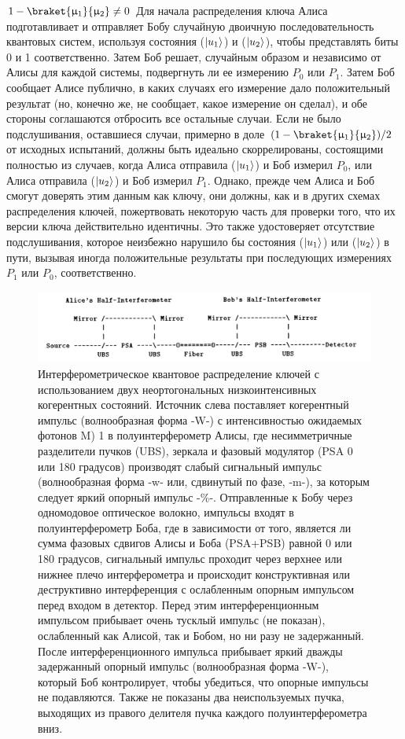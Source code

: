 $1 -\braket{\mu_1}{\mu_2}\neq 0$
Для начала распределения ключа Алиса подготавливает и отправляет Бобу случайную двоичную последовательность квантовых систем, используя состояния ($\lvert u_1\rangle$) и ($\lvert u_2\rangle$), чтобы представлять биты 0 и 1 соответственно. Затем Боб решает, случайным образом и независимо от Алисы для каждой системы, подвергнуть ли ее измерению $P_0$ или $P_1$. Затем Боб сообщает Алисе публично, в каких случаях его измерение дало положительный результат (но, конечно же, не сообщает, какое измерение он сделал), и обе стороны соглашаются отбросить все остальные случаи. Если не было подслушивания, оставшиеся случаи, примерно в доле $(1 -\braket{\mu_1}{\mu_2})/2$ от исходных испытаний, должны быть идеально скоррелированы, состоящими полностью из случаев, когда Алиса отправила ($\lvert u_1\rangle$) и Боб измерил $P_0$, или Алиса отправила ($\lvert u_2\rangle$) и Боб измерил $P_1$. Однако, прежде чем Алиса и Боб смогут доверять этим данным как ключу, они должны, как и в других схемах распределения ключей, пожертвовать некоторую часть для проверки того, что их версии ключа действительно идентичны. Это также удостоверяет отсутствие подслушивания, которое неизбежно нарушило бы состояния ($\lvert u_1\rangle$) или ($\lvert u_2\rangle$) в пути, вызывая иногда положительные результаты при последующих измерениях $P_1$ или $P_0$, соответственно.
\begin{figure}
    \centering
    \includegraphics[width=\linewidth]{images/B92 scheme from article.png}
    \caption{Интерферометрическое квантовое распределение ключей с использованием двух неортогональных низкоинтенсивных когерентных состояний. Источник слева поставляет когерентный импульс (волнообразная форма -W-) с интенсивностью ожидаемых фотонов M) 1 в полуинтерферометр Алисы, где несимметричные разделители пучков (UBS), зеркала и фазовый модулятор (PSA 0 или 180 градусов) производят слабый сигнальный импульс (волнообразная форма -w- или, сдвинутый по фазе, -m-), за которым следует яркий опорный импульс -\%-. Отправленные к Бобу через одномодовое оптическое волокно, импульсы входят в полуинтерферометр Боба, где в зависимости от того, является ли сумма фазовых сдвигов Алисы и Боба (PSA+PSB) равной 0 или 180 градусов, сигнальный импульс проходит через верхнее  или нижнее плечо интерферометра и происходит конструктивная или деструктивно интерференция с ослабленным опорным импульсом перед входом в детектор. Перед этим интерференционным импульсом прибывает очень тусклый импульс (не показан), ослабленный как Алисой, так и Бобом, но ни разу не задержанный. После интерференционного импульса прибывает яркий дважды задержанный опорный импульс (волнообразная форма -W-), который Боб контролирует, чтобы убедиться, что опорные импульсы не подавляются. Также не показаны два неиспользуемых пучка, выходящих из правого делителя пучка  каждого полуинтерферометра вниз.}
    \label{fig:B92 sch lit}
\end{figure}
